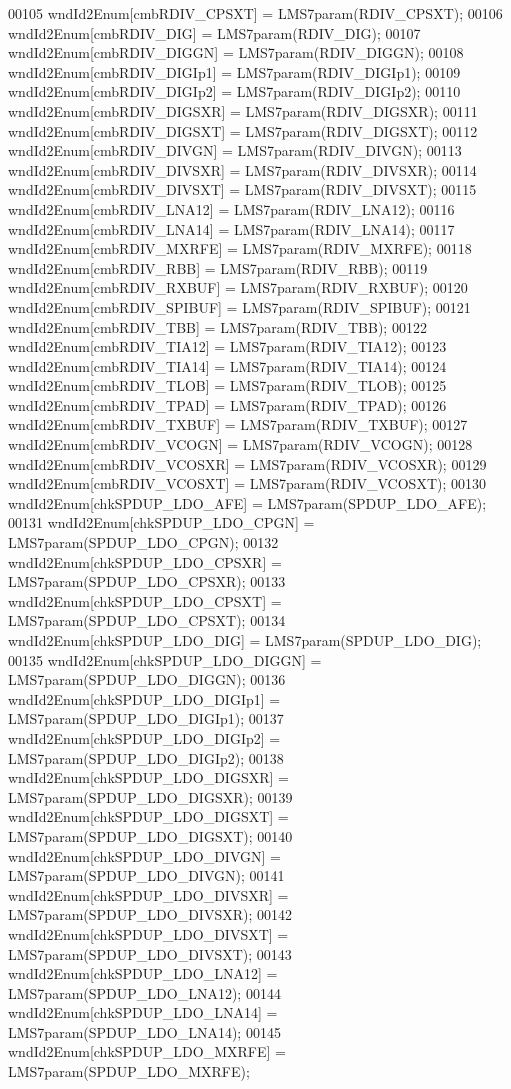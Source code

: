 \begin{DoxyCode}
00105     wndId2Enum[cmbRDIV_CPSXT] = LMS7param(RDIV_CPSXT);
00106     wndId2Enum[cmbRDIV_DIG] = LMS7param(RDIV_DIG);
00107     wndId2Enum[cmbRDIV_DIGGN] = LMS7param(RDIV_DIGGN);
00108     wndId2Enum[cmbRDIV_DIGIp1] = LMS7param(RDIV_DIGIp1);
00109     wndId2Enum[cmbRDIV_DIGIp2] = LMS7param(RDIV_DIGIp2);
00110     wndId2Enum[cmbRDIV_DIGSXR] = LMS7param(RDIV_DIGSXR);
00111     wndId2Enum[cmbRDIV_DIGSXT] = LMS7param(RDIV_DIGSXT);
00112     wndId2Enum[cmbRDIV_DIVGN] = LMS7param(RDIV_DIVGN);
00113     wndId2Enum[cmbRDIV_DIVSXR] = LMS7param(RDIV_DIVSXR);
00114     wndId2Enum[cmbRDIV_DIVSXT] = LMS7param(RDIV_DIVSXT);
00115     wndId2Enum[cmbRDIV_LNA12] = LMS7param(RDIV_LNA12);
00116     wndId2Enum[cmbRDIV_LNA14] = LMS7param(RDIV_LNA14);
00117     wndId2Enum[cmbRDIV_MXRFE] = LMS7param(RDIV_MXRFE);
00118     wndId2Enum[cmbRDIV_RBB] = LMS7param(RDIV_RBB);
00119     wndId2Enum[cmbRDIV_RXBUF] = LMS7param(RDIV_RXBUF);
00120     wndId2Enum[cmbRDIV_SPIBUF] = LMS7param(RDIV_SPIBUF);
00121     wndId2Enum[cmbRDIV_TBB] = LMS7param(RDIV_TBB);
00122     wndId2Enum[cmbRDIV_TIA12] = LMS7param(RDIV_TIA12);
00123     wndId2Enum[cmbRDIV_TIA14] = LMS7param(RDIV_TIA14);
00124     wndId2Enum[cmbRDIV_TLOB] = LMS7param(RDIV_TLOB);
00125     wndId2Enum[cmbRDIV_TPAD] = LMS7param(RDIV_TPAD);
00126     wndId2Enum[cmbRDIV_TXBUF] = LMS7param(RDIV_TXBUF);
00127     wndId2Enum[cmbRDIV_VCOGN] = LMS7param(RDIV_VCOGN);
00128     wndId2Enum[cmbRDIV_VCOSXR] = LMS7param(RDIV_VCOSXR);
00129     wndId2Enum[cmbRDIV_VCOSXT] = LMS7param(RDIV_VCOSXT);
00130     wndId2Enum[chkSPDUP_LDO_AFE] = LMS7param(SPDUP_LDO_AFE);
00131     wndId2Enum[chkSPDUP_LDO_CPGN] = LMS7param(SPDUP_LDO_CPGN);
00132     wndId2Enum[chkSPDUP_LDO_CPSXR] = LMS7param(SPDUP_LDO_CPSXR);
00133     wndId2Enum[chkSPDUP_LDO_CPSXT] = LMS7param(SPDUP_LDO_CPSXT);
00134     wndId2Enum[chkSPDUP_LDO_DIG] = LMS7param(SPDUP_LDO_DIG);
00135     wndId2Enum[chkSPDUP_LDO_DIGGN] = LMS7param(SPDUP_LDO_DIGGN);
00136     wndId2Enum[chkSPDUP_LDO_DIGIp1] = LMS7param(SPDUP_LDO_DIGIp1);
00137     wndId2Enum[chkSPDUP_LDO_DIGIp2] = LMS7param(SPDUP_LDO_DIGIp2);
00138     wndId2Enum[chkSPDUP_LDO_DIGSXR] = LMS7param(SPDUP_LDO_DIGSXR);
00139     wndId2Enum[chkSPDUP_LDO_DIGSXT] = LMS7param(SPDUP_LDO_DIGSXT);
00140     wndId2Enum[chkSPDUP_LDO_DIVGN] = LMS7param(SPDUP_LDO_DIVGN);
00141     wndId2Enum[chkSPDUP_LDO_DIVSXR] = LMS7param(SPDUP_LDO_DIVSXR);
00142     wndId2Enum[chkSPDUP_LDO_DIVSXT] = LMS7param(SPDUP_LDO_DIVSXT);
00143     wndId2Enum[chkSPDUP_LDO_LNA12] = LMS7param(SPDUP_LDO_LNA12);
00144     wndId2Enum[chkSPDUP_LDO_LNA14] = LMS7param(SPDUP_LDO_LNA14);
00145     wndId2Enum[chkSPDUP_LDO_MXRFE] = LMS7param(SPDUP_LDO_MXRFE);

\end{DoxyCode}
